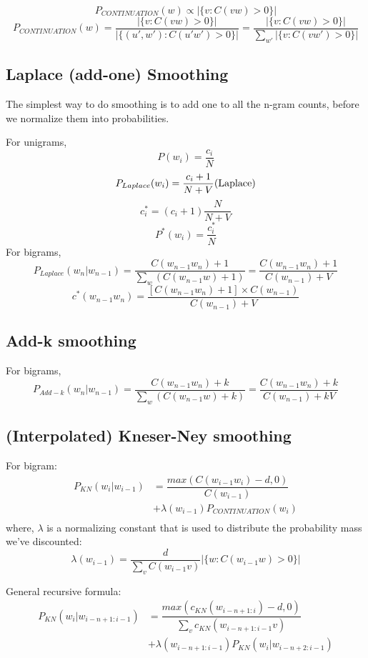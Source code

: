 \[
    P_{CONTINUATION}(w) \propto |\{v : C(vw) > 0\}|
\]
\[
    P_{CONTINUATION}(w) = \displaystyle\dfrac{|\{v : C(vw) > 0\}|}{|\{(u',w') : C(u'w') > 0\}| } = \displaystyle\dfrac{|\{v : C(vw) > 0\}|}{\sum_{w'} |\{v : C(vw') > 0\}|}
\]

\subsection{Laplace (add-one) Smoothing \cite{nlp-1}}
The simplest way to do smoothing is to add one to all the n-gram counts, before we normalize them into probabilities.

For unigrams,
\[
    P(w_i) = \displaystyle\dfrac{c_i}{N}
\]
\[
    P_{Laplace}(w_i) = \displaystyle\dfrac{c_i + 1}{N + V} \hfill \text{(Laplace)}
\]
\[
    c_i^* = (c_i +1)\displaystyle\dfrac{N}{N + V}
\]
\[
    P^*(w_i) = \displaystyle\dfrac{c_i^*}{N}
\]
For bigrams,
\[
    P_{Laplace}(w_n|w_{n-1}) = \displaystyle\dfrac{C(w_{n-1}w_n) + 1}{\sum_w (C(w_{n-1}w) + 1)} = \displaystyle\dfrac{C(w_{n-1}w_n) + 1}{C(w_{n-1}) + V} 
\]
\[
    c^*(w_{n-1}w_n) = \displaystyle\dfrac{[C(w_{n-1}w_n)+1] \times C(w_{n-1})}{C(w_{n-1}) + V} 
\]

\subsection{Add-k smoothing \cite{nlp-1}}

For bigrams,
\[
    P_{Add-k}(w_n|w_{n-1}) = \displaystyle\dfrac{C(w_{n-1}w_n) + k}{\sum_w (C(w_{n-1}w) + k)} = \displaystyle\dfrac{C(w_{n-1}w_n) + k}{C(w_{n-1}) + kV} 
\]

\subsection{(Interpolated) Kneser-Ney smoothing}

For bigram:
\begin{align*}
    P_{KN}(w_i|w_{i-1})  &= \displaystyle\dfrac{max(C(w_{i-1}w_i)-d,0)}{C(w_{i-1})} \\ 
    &+ \lambda (w_{i-1})P_{CONTINUATION}(w_i) \\ 
\end{align*}
where, $\lambda$ is a normalizing constant that is used to distribute the probability mass we’ve discounted:
\[
    \lambda(w_{i-1}) = \displaystyle\dfrac{d}{\sum_v C(w_{i-1}v)} |\{w : C(w_{i-1}w) > 0\}|
\]

General recursive formula:
\begin{align*}
    P_{KN}(w_i|w_{i-n+1:i-1})  &= \displaystyle\dfrac{max(c_{KN}(w_{i-n+1:i})-d,0)}{\sum_v c_{KN}(w_{i-n+1:i-1} v)} \\ 
    &+ \lambda (w_{i-n+1:i-1})P_{KN}(w_i|w_{i-n+2:i-1}) 
\end{align*}

